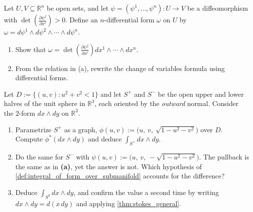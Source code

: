 

\begin{exercise}
\label{ex:change_of_variables_differential_forms}
Let $U,V \subseteq \mathbb{R}^n$ be open sets, and let $\psi = (\psi^1,\ldots,\psi^n) : U \to
V$ be a diffeomorphism with $\det\!\left(\frac{\partial\psi^j}{\partial x^i}\right) > 0$.
Define an $n$-differential form $\omega$ on $U$ by $\omega = d\psi^1\wedge d\psi^2\wedge\cdots
\wedge d\psi^n$.
\begin{enumerate}[label=\textbf{(\alph*)}]
  \item Show that $\omega = \det\!\left(\frac{\partial\psi^j}{\partial x^i}\right) dx^1\wedge
  \cdots\wedge dx^n$.
  \item From the relation in (a), rewrite the change of variables formula using differential
  forms.
\end{enumerate}
\end{exercise}

\begin{aiexercise}
\label{ex:ai_area_form_over_hemisphere}
Let $D := \{(u,v) : u^2+v^2 < 1\}$ and let $S^+$ and $S^-$ be the open upper and lower halves of
the unit sphere in $\mathbb{R}^3$, each oriented by the \emph{outward} normal. Consider the
$2$-form $dx\wedge dy$ on $\mathbb{R}^3$.
\begin{enumerate}[label=\textbf{(\alph*)}]
  \item Parametrize $S^+$ as a graph, $\phi(u,v) := \big(u,\ v,\ \sqrt{1-u^2-v^2}\big)$ over
    $D$. Compute $\phi^*(dx\wedge dy)$ and deduce $\int_{S^+} dx\wedge dy$.
  \item Do the same for $S^-$ with $\psi(u,v) := \big(u,\ v,\ -\sqrt{1-u^2-v^2}\big)$. The
    pullback is the same as in \textbf{(a)}, yet the answer is not. Which hypothesis of
    \cref{def:integral_of_form_over_submanifold} accounts for the difference?
  \item Deduce $\int_{S^2} dx\wedge dy$, and confirm the value a second time by writing
    $dx\wedge dy = d(x\,dy)$ and applying \cref{thm:stokes_general}.
\end{enumerate}
\end{aiexercise}
